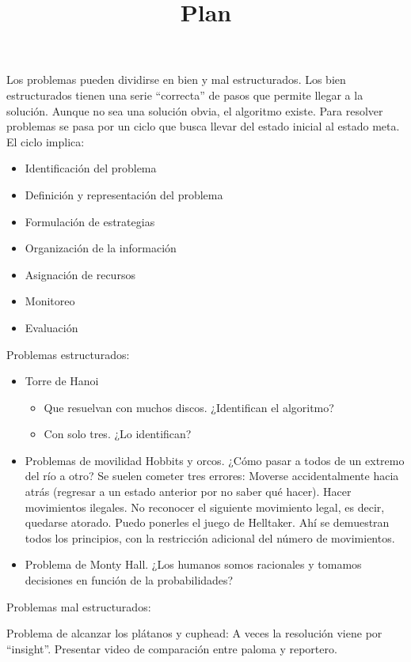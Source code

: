 \documentclass[a4paper,12pt]{article}
\title{Plan}
\author{}
\date{}
\begin{document}
{\scshape\bfseries \maketitle}

Los problemas pueden dividirse en bien y mal estructurados. Los bien estructurados tienen una serie ``correcta'' de pasos que permite llegar a la solución. Aunque no sea una solución obvia, el algoritmo existe.
Para resolver problemas se pasa por un ciclo que busca llevar del estado inicial al estado meta. El ciclo implica:
\begin{itemize}
	\item Identificación del problema
	\item Definición y representación del problema
	\item Formulación de estrategias
	\item Organización de la información
	\item Asignación de recursos
	\item Monitoreo
	\item Evaluación
\end{itemize}

Problemas estructurados:
\begin{itemize}
	\item Torre de Hanoi
		\begin{itemize}
			\item Que resuelvan con muchos discos. ¿Identifican el algoritmo?
			\item Con solo tres. ¿Lo identifican?
		\end{itemize}
	\item Problemas de movilidad
		Hobbits y orcos. ¿Cómo pasar a todos de un extremo del río a otro?
		Se suelen cometer tres errores:
		Moverse accidentalmente hacia atrás (regresar a un estado anterior por no saber qué hacer).
		Hacer movimientos ilegales.
		No reconocer el siguiente movimiento legal, es decir, quedarse atorado.
		Puedo ponerles el juego de Helltaker. Ahí se demuestran todos los principios, con la restricción adicional del número de movimientos.
	\item Problema de Monty Hall.
		¿Los humanos somos racionales y tomamos decisiones en función de la probabilidades?
\end{itemize}

Problemas mal estructurados:

Problema de alcanzar los plátanos y cuphead: A veces la resolución viene por ``insight''. Presentar video de comparación entre paloma y reportero.
\end{document}
